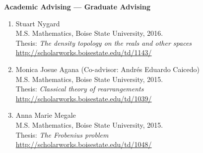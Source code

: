 \documentclass[12pt]{article}
\begin{document}



\textbf{Academic Advising --- Graduate Advising}
\begin{enumerate}
\item
Stuart Nygard \\
M.S. Mathematics, Boise State University, 2016. \\
Thesis: \emph{The density topology on the reals and other spaces} \\
\url{http://scholarworks.boisestate.edu/td/1143/}

\item Monica Josue Agana (Co-advisor: Andr\'es Eduardo Caicedo) \\
M.S. Mathematics, Boise State University, 2015. \\
Thesis: \emph{Classical theory of rearrangements} \\
\url{http://scholarworks.boisestate.edu/td/1039/}

\item Anna Marie Megale \\
M.S. Mathematics, Boise State University, 2015. \\
Thesis: \emph{The Frobenius problem} \\
\url{http://scholarworks.boisestate.edu/td/1048/}


\end{enumerate}
\end{document}
